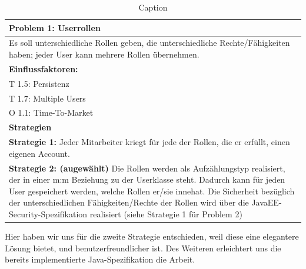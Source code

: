 \documentclass[enabledeprecatedfontcommands,fontsize=12pt,paper=a4,twoside]{scrartcl}
\begin{document}
\begin{table}[H]
    \centering
    \begin{tabular}{|p{15cm}|}
    \hline
          \textbf{Problem 1:} Userrollen \\ \hline
          Es soll unterschiedliche Rollen geben, die unterschiedliche Rechte/Fähigkeiten haben; jeder User kann mehrere Rollen übernehmen. \\ \hline
          \textbf{Einflussfaktoren: } \\
          T 1.5: Persistenz \\
          T 1.7: Multiple Users\\
          O 1.1: Time-To-Market \\
          \hline
          \textbf{Strategien} \\ \hline
          \textbf{Strategie 1:} Jeder Mitarbeiter kriegt für jede der Rollen, die er erfüllt, einen eigenen Account. \\
          \textbf{Strategie 2: (augewählt)} Die Rollen werden als Aufzählungstyp realisiert, der in einer m:m Beziehung zu der Userklasse steht. Dadurch kann für jeden User gespeichert werden, welche Rollen er/sie innehat. Die Sicherheit bezüglich der unterschiedlichen Fähigkeiten/Rechte der Rollen wird über die JavaEE-Security-Spezifikation realisiert (siehe Strategie 1 für Problem 2)\\
    \end{tabular}

    \caption{Caption}
    \label{tab:my_label}
\end{table}
Hier haben wir uns für die zweite Strategie entschieden, weil diese eine elegantere Lösung bietet, und benutzerfreundlicher ist. Des Weiteren erleichtert uns die bereits implementierte Java-Spezifikation die Arbeit. \\
\end{document}

